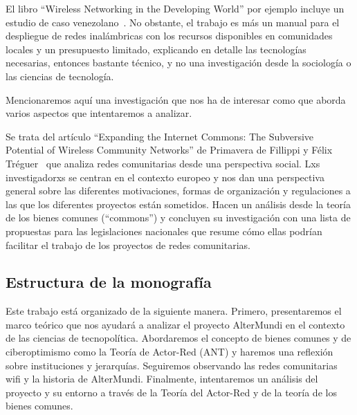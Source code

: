 El libro ``Wireless Networking in the Developing World'' por ejemplo incluye un estudio de caso venezolano~\autocite[437-452]{WNDW2013}.
No obstante, el trabajo es más un manual para el despliegue de redes inalámbricas con los recursos disponibles en comunidades locales y un presupuesto limitado, explicando en detalle las tecnologías necesarias, entonces bastante técnico, y no una investigación desde la sociología o las ciencias de tecnología.

Mencionaremos aquí una investigación que nos ha de interesar como que aborda varios aspectos que intentaremos a analizar.

Se trata del artículo ``Expanding the Internet Commons: The Subversive Potential of Wireless Community Networks'' de Primavera de Fillippi y Félix Tréguer~\autocite{FiTre2015} que analiza redes comunitarias desde una perspectiva social.
Lxs investigadorxs se centran en el contexto europeo y nos dan una perspectiva general sobre las diferentes motivaciones, formas de organización y regulaciones a las que los diferentes proyectos están sometidos.
Hacen un análisis desde la teoría de los bienes comunes (``commons'') y concluyen su investigación con una lista de propuestas para las legislaciones nacionales que resume cómo ellas podrían facilitar el trabajo de los proyectos de redes comunitarias.

\subsection{Estructura de la monografía}

Este trabajo está organizado de la siguiente manera.
Primero, presentaremos el marco teórico que nos ayudará a analizar el proyecto AlterMundi en el contexto de las ciencias de tecnopolítica.
Abordaremos el concepto de bienes comunes y de ciberoptimismo como la Teoría de Actor-Red (ANT) y haremos una reflexión sobre instituciones y jerarquías.
Seguiremos observando las redes comunitarias wifi y la historia de AlterMundi.
Finalmente, intentaremos un análisis del proyecto y su entorno a través de la Teoría del Actor-Red y de la teoría de los bienes comunes.
